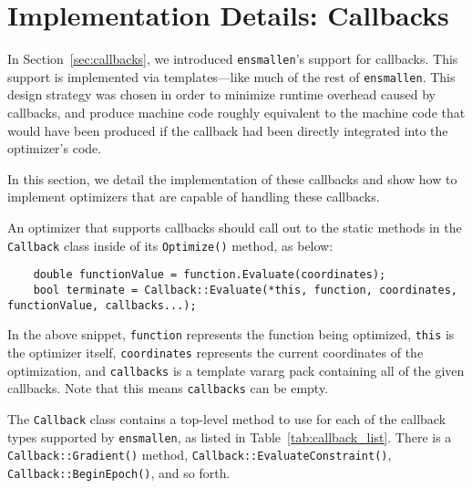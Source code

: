 \section{Implementation Details: Callbacks}
\label{sec:callback_internals}

In Section~\ref{sec:callbacks}, we introduced {\tt ensmallen}'s support for
callbacks.  This support is implemented via templates---like much of the rest of
{\tt ensmallen}.  This design strategy was chosen in order to minimize runtime
overhead caused by callbacks, and produce machine code roughly equivalent to the
machine code that would have been produced if the callback had been directly
integrated into the optimizer's code.

In this section, we detail the implementation of these callbacks and show how to
implement optimizers that are capable of handling these callbacks.

An optimizer that supports callbacks should call out to the static methods in
the {\tt Callback} class inside of its {\tt Optimize()} method, as below:
%
\begin{verbatim}
    double functionValue = function.Evaluate(coordinates);
    bool terminate = Callback::Evaluate(*this, function, coordinates, functionValue, callbacks...);
\end{verbatim}

In the above snippet, {\tt function} represents the function being optimized,
{\tt *this} is the optimizer itself, {\tt coordinates} represents the current
coordinates of the optimization, and {\tt callbacks} is a template vararg pack
containing all of the given callbacks.
Note that this means {\tt callbacks} can be empty.

The {\tt Callback} class contains a top-level method to use for each of the
callback types supported by {\tt ensmallen}, as listed in Table~\ref{tab:callback_list}.
There is a {\tt Callback::Gradient()} method, {\tt Callback::EvaluateConstraint()},
{\tt Callback::BeginEpoch()}, and so forth. 

